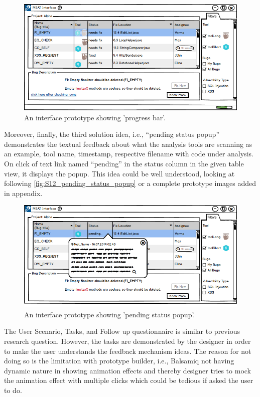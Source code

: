 \begin{figure}[hbt!]
	\centering
	\includegraphics[width=\linewidth]{figures/solution_ideas_snaps/S12_disabled_icons_progress_bar}
	\caption{An interface prototype showing 'progress bar'.}
	\label{fig:S12_disabled_icons_progress_bar}
\end{figure}


Moreover, finally, the third solution idea, i.e., “pending status popup” demonstrates the textual feedback about what the analysis tools are scanning as an example, tool name, timestamp, respective filename with code under analysis. On click of text link named “pending” in the status column in the given table view, it displays the popup. This idea could be well understood, looking at following \autoref{fig:S12_pending_status_popup} or a complete prototype images added in appendix. \\


\begin{figure}[hbt!]
	\centering
	\includegraphics[width=\linewidth]{figures/solution_ideas_snaps/S12_pending_status_popup}
	\caption{An interface prototype showing 'pending status popup'.}
	\label{fig:S12_pending_status_popup}
\end{figure}

The User Scenario, Tasks, and Follow up questionnaire is similar to previous research question. However, the tasks are demonstrated by the designer in order to make the user understands the feedback mechanism ideas. The reason for not doing so is the limitation with prototype builder, i.e., Balsamiq not having dynamic nature in showing animation effects and thereby designer tries to mock the animation effect with multiple clicks which could be tedious if asked the user to do. \\

